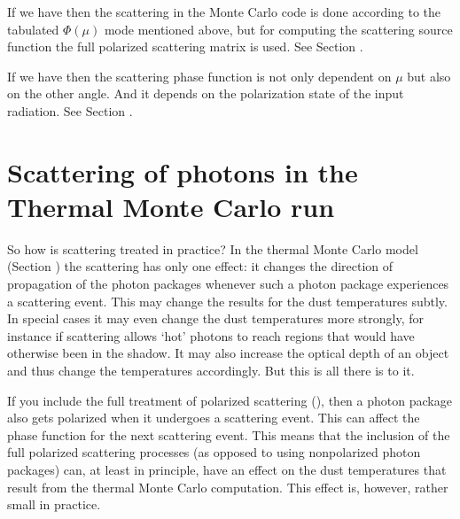 \documentclass[letterpaper,10pt,english]{sphinxmanual}
\begin{document}
If we have  then the scattering in the Monte Carlo code is
done according to the tabulated \(\Phi(\mu)\) mode mentioned above, but for
computing the scattering source function the full polarized scattering matrix is
used. See Section {\hyperref[\detokenize{dustradtrans:sec-polarized-scattering}]{}}.

If we have  then the scattering phase function is not only
dependent on \(\mu\) but also on the other angle.  And it depends on the
polarization state of the input radiation. See Section
{\hyperref[\detokenize{dustradtrans:sec-polarized-scattering}]{}}.


\section{Scattering of photons in the Thermal Monte Carlo run}
\label{\detokenize{dustradtrans:scattering-of-photons-in-the-thermal-monte-carlo-run}}\label{\detokenize{dustradtrans:sec-scat-in-therm-mc}}
So how is scattering treated in practice? In the thermal Monte Carlo model
(Section {\hyperref[\detokenize{dustradtrans:sec-dust-thermal-monte-carlo}]{}}) the scattering has only one
effect: it changes the direction of propagation of the photon packages whenever
such a photon package experiences a scattering event. This may change the
results for the dust temperatures subtly. In special cases it may even change
the dust temperatures more strongly, for instance if scattering allows ‘hot’
photons to reach regions that would have otherwise been in the shadow. It may
also increase the optical depth of an object and thus change the temperatures
accordingly. But this is all there is to it.

If you include the full treatment of polarized scattering
(), then a photon package also gets polarized when it
undergoes a scattering event. This can affect the phase function for the next
scattering event. This means that the inclusion of the full polarized scattering
processes (as opposed to using non\sphinxhyphen{}polarized photon packages) can, at least in
principle, have an effect on the dust temperatures that result from the thermal
Monte Carlo computation. This effect is, however, rather small in practice.
\end{document}
